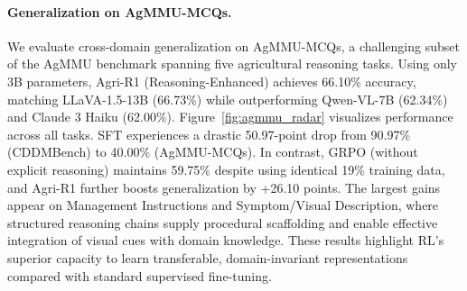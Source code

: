 \documentclass[sigconf,anonymous,review]{acmart}
\begin{document}
\paragraph{\textbf{Generalization on AgMMU-MCQs.}}
We evaluate cross-domain generalization on AgMMU-MCQs, a challenging subset of the AgMMU benchmark spanning five agricultural reasoning tasks. Using only 3B parameters, Agri-R1 (Reasoning-Enhanced) achieves 66.10\% accuracy, matching LLaVA-1.5-13B (66.73\%) while outperforming Qwen-VL-7B (62.34\%) and Claude 3 Haiku (62.00\%). Figure~\ref{fig:agmmu_radar} visualizes performance across all tasks. SFT experiences a drastic 50.97-point drop from 90.97\% (CDDMBench) to 40.00\% (AgMMU-MCQs). In contrast, GRPO (without explicit reasoning) maintains 59.75\% despite using identical 19\% training data, and Agri-R1 further boosts generalization by +26.10 points. The largest gains appear on Management Instructions and Symptom/Visual Description, where structured reasoning chains supply procedural scaffolding and enable effective integration of visual cues with domain knowledge. These results highlight RL's superior capacity to learn transferable, domain-invariant representations compared with standard supervised fine-tuning.


\end{document}
